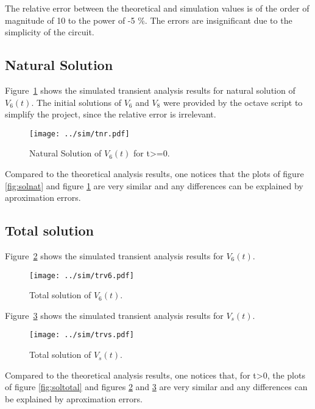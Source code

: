 The relative error between the theoretical and simulation values is of the order of magnitude of 10 to the power of -5 \%. The errors are insignificant due to the simplicity of the circuit.

\subsection{Natural Solution}

Figure~\ref{fig:natsol} shows the simulated transient analysis results for natural solution of $V_6(t)$. The initial solutions of $V_6$ and $V_8$ were provided by the octave script to simplify the project, since the relative error is irrelevant. 

\begin{figure}[h] \centering
\texttt{[image: ../sim/tnr.pdf]}
\caption{Natural Solution of $V_6(t)$ for t>=0.}
\label{fig:natsol}
\end{figure}

Compared to the theoretical analysis results, one
notices that the plots of figure \ref{fig:solnat} and figure \ref{fig:natsol} are very similar and any differences can be explained by aproximation errors.

\subsection{Total solution}

Figure~\ref{fig:totalsolV6} shows the simulated transient analysis results for $V_6(t)$.

\begin{figure}[h] \centering
\texttt{[image: ../sim/trv6.pdf]}
\caption{Total solution of $V_6(t)$.}
\label{fig:totalsolV6}
\end{figure}

Figure~\ref{fig:totalsolVs} shows the simulated transient analysis results for $V_s(t)$.

\begin{figure}[h] \centering
\texttt{[image: ../sim/trvs.pdf]}
\caption{Total solution of $V_s(t)$.}
\label{fig:totalsolVs}
\end{figure}

Compared to the theoretical analysis results, one
notices that, for t>0, the plots of figure \ref{fig:soltotal} and figures \ref{fig:totalsolV6} and \ref{fig:totalsolVs} are very similar and any differences can be explained by aproximation errors.


